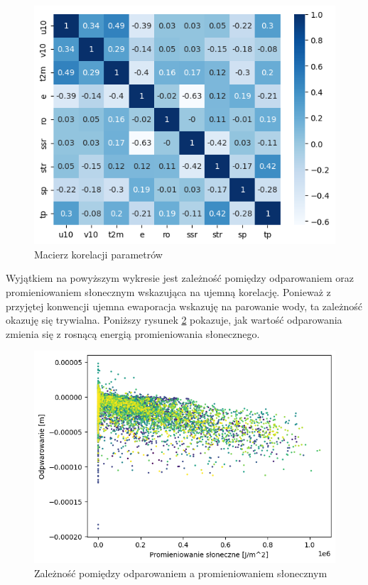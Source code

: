 \begin{figure}[H]
    \centering
    \includegraphics[width=\textwidth]{images/correlation_matrix.png}
    \caption{Macierz korelacji parametrów}
    \label{matrix}
\end{figure}

Wyjątkiem na powyższym wykresie jest zależność pomiędzy odparowaniem oraz promieniowaniem 
słonecznym wskazująca na ujemną korelację. Ponieważ z przyjętej konwencji ujemna ewaporacja
wskazuję na parowanie wody, ta zależność okazuję się trywialna. Poniższy rysunek
\ref{e-ssr} pokazuje, jak wartość odparowania zmienia się z rosnącą energią
promieniowania słonecznego.

\begin{figure}[H]
    \centering
    \includegraphics[width=\textwidth]{images/e-ssr.png}
    \caption{Zależność pomiędzy odparowaniem a promieniowaniem słonecznym}
    \label{e-ssr}
\end{figure}


